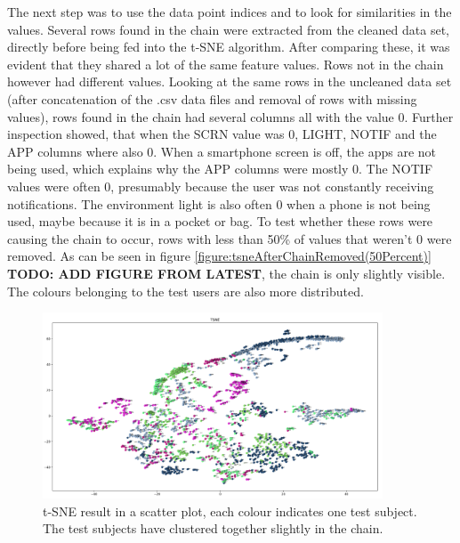 The next step was to use the data point indices and to look for similarities in the values. Several rows found in the chain were extracted from the cleaned data set, directly before being fed into the t-SNE algorithm. After comparing these, it was evident that they shared a lot of the same feature values. Rows not in the chain however had different values. Looking at the same rows in the uncleaned data set (after concatenation of the .csv data files and removal of rows with missing values), rows found in the chain had several columns all with the value 0. Further inspection showed, that when the SCRN value was 0, LIGHT, NOTIF and the APP columns where also 0. When a smartphone screen is off, the apps are not being used, which explains why the APP columns were mostly 0. The NOTIF values were often 0, presumably because the user was not constantly receiving notifications. The environment light is also often 0 when a phone is not being used, maybe because it is in a pocket or bag. To test whether these rows were causing the chain to occur, rows with less than 50\% of values that weren't 0 were removed. As can be seen in figure \ref{figure:tsneAfterChainRemoved(50Percent)} \textbf{TODO: ADD FIGURE FROM LATEST}, the chain is only slightly visible. The colours belonging to the test users are also more distributed.


\begin{figure}[h]
  \centering
  \includegraphics[width=0.9\textwidth]{./images/tsneTestSubjectsColor.png}
  \caption{t-SNE result in a scatter plot, each colour indicates one test subject. The test subjects have clustered together slightly in the chain.}
  \label{figure:tsneTestSubjectsColor}
\end{figure}

